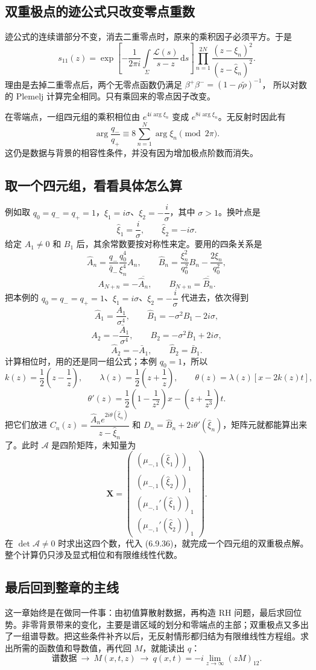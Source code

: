 \documentclass[lang=cn,scheme=chinese,mode=simple,device=normal,color=blue,math=cm,thmcnt=section,12pt]{elegantbook}
\newcommand{\dd}{\,\mathrm{d}}
\newcommand{\eqq}[2]{\tag{#1}\label{eq:#1}#2}
\begin{document}
\subsection*{双重极点的迹公式只改变零点重数}
迹公式的连续谱部分不变，消去二重零点时，原来的乘积因子必须平方。于是
\begin{equation}\eqq{6.9.29}{s_{11}(z)=
\exp\left[-\dfrac{1}{2\pi i}\int\limits_\Sigma
\dfrac{\mathcal L(s)}{s-z}\dd s\right]
\prod\limits_{n=1}^{2N}\dfrac{(z-\xi_n)^2}{(z-\widehat\xi_n)^2}.}\end{equation}
理由是去掉二重零点后，两个无零点函数仍满足
$\beta^+\beta^-=(1-\rho\widetilde\rho)^{-1}$，
所以对数的 Plemelj 计算完全相同。只有乘回来的零点因子改变。

在零端点，一组四元组的乘积相位由 $e^{4i\arg\xi_n}$ 变成 $e^{8i\arg\xi_n}$。无反射时因此有
\begin{equation}\eqq{6.9.34}{\arg\dfrac{q_-}{q_+}
\equiv8\sum\limits_{n=1}^N\arg\xi_n\pmod{2\pi}.}\end{equation}
这仍是数据与背景的相容性条件，并没有因为增加极点阶数而消失。

\subsection*{取一个四元组，看看具体怎么算}
例如取 $q_0=q_-=q_+=1$，$\xi_1=i\sigma$、$\xi_2=-\dfrac{i}{\sigma}$，其中 $\sigma>1$。换叶点是
\[
\widehat\xi_1=\dfrac{i}{\sigma},\qquad \widehat\xi_2=-i\sigma.
\]
给定 $A_1\ne0$ 和 $B_1$ 后，其余常数要按对称性来定。要用的四条关系是
\[
\widehat A_n=\dfrac{q_-}{\bar q_-}\dfrac{q_0^4}{\xi_n^4}A_n,\qquad
\widehat B_n=\dfrac{\xi_n^2}{q_0^2}B_n-\dfrac{2\xi_n}{q_0^2},
\]
\[
A_{N+n}=-\overline{\widehat A_n},\qquad
B_{N+n}=\overline{\widehat B_n}.
\]
把本例的 $q_0=q_-=q_+=1$、$\xi_1=i\sigma$、$\xi_2=-\dfrac{i}{\sigma}$ 代进去，依次得到
\[
\widehat A_1=\dfrac{A_1}{\sigma^4},\qquad
\widehat B_1=-\sigma^2B_1-2i\sigma,
\]
\[
A_2=-\dfrac{\bar A_1}{\sigma^4},\qquad
B_2=-\sigma^2\bar B_1+2i\sigma,
\]
\[
\widehat A_2=-\bar A_1,\qquad \widehat B_2=\bar B_1.
\]
计算相位时，用的还是同一组公式；本例 $q_0=1$，所以
\[
k(z)=\dfrac{1}{2}\left(z-\dfrac{1}{z}\right),\qquad
\lambda(z)=\dfrac{1}{2}\left(z+\dfrac{1}{z}\right),\qquad
\theta(z)=\lambda(z)[x-2k(z)t],
\]
\[
\theta'(z)=\dfrac{1}{2}\left(1-\dfrac{1}{z^2}\right)x
-\left(z+\dfrac{1}{z^3}\right)t.
\]
把它们放进 $C_n(z)=\dfrac{\widehat A_ne^{2i\theta(\widehat\xi_n)}}{z-\widehat\xi_n}$ 和
$D_n=\widehat B_n+2i\theta'(\widehat\xi_n)$，矩阵元就都能算出来了。此时 $\mathcal A$ 是四阶矩阵，未知量为
\[
\boldsymbol X=
\begin{pmatrix}
(\mu_{-,1}(\widehat\xi_1))_1\\
(\mu_{-,1}(\widehat\xi_2))_1\\
(\mu_{-,1}'(\widehat\xi_1))_1\\
(\mu_{-,1}'(\widehat\xi_2))_1
\end{pmatrix}.
\]
在 $\det\mathcal A\ne0$ 时求出这四个数，代入 (6.9.36)，就完成一个四元组的双重极点解。整个计算仍只涉及显式相位和有限维线性代数。

\subsection*{最后回到整章的主线}
这一章始终是在做同一件事：由初值算散射数据，再构造 RH 问题，最后求回位势。非零背景带来的变化，主要是谱区域的划分和零端点的主部；双重极点又多出了一组谱导数。把这些条件补齐以后，无反射情形都归结为有限维线性方程组。求出所需的函数值和导数值，再代回 $M$，就能读出 $q$：
\[
\boxed{\text{谱数据}\ \longrightarrow\ M(x,t,z)
\ \longrightarrow\ q(x,t)=-i\lim\limits_{z\to\infty}(zM)_{12}.}
\]
\end{document}
